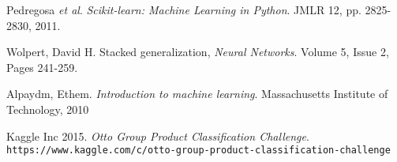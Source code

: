 \begin{thebibliography}{9}
Pedregosa \textit{et al}. 
\textit{Scikit-learn: Machine Learning in Python}. 
JMLR 12, pp. 2825-2830, 2011.
 
Wolpert, David H. 
Stacked generalization, \textit{Neural Networks}.
Volume 5, Issue 2, Pages 241-259.

Alpaydm, Ethem.
\textit{Introduction to machine learning}.
Massachusetts Institute of Technology, 2010
 
Kaggle Inc 2015.
\textit{Otto Group Product Classification Challenge}.
\\\texttt{https://www.kaggle.com/c/otto-group-product-classification-challenge}
\end{thebibliography}